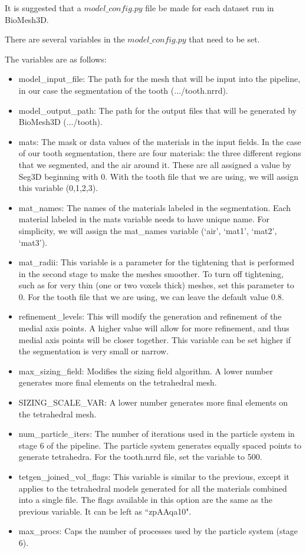 \documentclass[fleqn,12pt,openany]{book}
\begin{document}
It is suggested that a $model\_config.py$ file be made for each dataset run 
in BioMesh3D.

There are several variables in the $model\_config.py$ that need to be set.  

The variables are as follows:

\begin{itemize}
	\item model\_input\_file: The path for the mesh that will be input into the pipeline, in our case the segmentation of the tooth (.../tooth.nrrd).
	\item model\_output\_path: The path for the output files that will be generated by BioMesh3D (.../tooth).
	\item mats: The mask or data values of the materials in the input fields.  In the case of our tooth segmentation, there are four materials:  the three different regions that we segmented, and the air around it.  These are all assigned a value by Seg3D beginning with 0.  With the tooth file that we are using, we will assign this variable (0,1,2,3).
	\item mat\_names: The names of the materials labeled in the segmentation.  Each material labeled in the mats variable needs to have unique name.  For simplicity, we will assign the mat\_names variable (`air', `mat1', `mat2', `mat3').
	\item mat\_radii: This variable is a parameter for the tightening that is performed in the second stage to make the meshes smoother.  To turn off tightening, such as for very thin (one or two voxels thick) meshes, set this parameter to 0. For the tooth file that we are using, we can leave the default value 0.8.  
	\item refinement\_levels: This will modify the generation and refinement of the medial axis points.  A higher value will allow for more refinement, and thus medial axis points will be closer together. This variable can be set higher if the segmentation is very small or narrow.
	\item max\_sizing\_field: Modifies the sizing field algorithm.  A lower number generates more final elements on the tetrahedral mesh.
	\item SIZING\_SCALE\_VAR: A lower number generates more final elements on the tetrahedral mesh.
	\item num\_particle\_iters: The number of iterations used in the particle system in stage 6 of the pipeline.  The particle system generates equally spaced points to generate tetrahedra.  For the tooth.nrrd file, set the variable to 500.
	\item tetgen\_joined\_vol\_flags: This variable is similar to the previous, except it applies to the tetrahedral models generated for all the materials combined into a single file.  The flags available in this option are the same as the previous variable.  It can be left as ``zpAAqa10".
	\item max\_procs: Caps the number of processes used by the particle system (stage 6).
\end{itemize}
\end{document}
